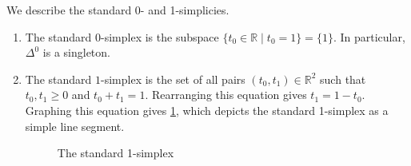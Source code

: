 \begin{example}\label{2.1.4}
    We describe the standard 0- and 1-simplicies.   
    \begin{enumerate}
        \item The standard $0$-simplex is the subspace $\{t_0\in\mathbb{R}\mid t_0=1\}=\{1\}$. In particular, $\Delta^0$ is a singleton.
        \item The standard $1$-simplex is the set of all pairs $(t_0,t_1)\in\mathbb{R}^2$ such that $t_0,t_1\geq 0$ and $t_0+t_1=1$. Rearranging this equation gives $t_1=1-t_0$. Graphing this equation gives \cref{fig:2}, which depicts the standard 1-simplex as a simple line segment.
        \begin{figure}[ht]
            \centering
            \caption{The standard 1-simplex}
            \label{fig:2}
        \end{figure}
    \end{enumerate}
\end{example}

